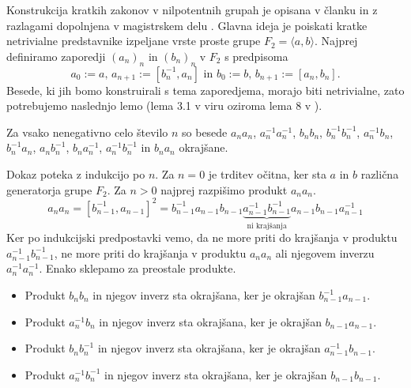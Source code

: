 Konstrukcija kratkih zakonov v nilpotentnih grupah je opisana v članku \cite{Elkasapy_Thom_2013} in z razlagami dopolnjena v magistrskem delu \cite{Schneider_2016}.
Glavna ideja je poiskati kratke netrivialne predstavnike izpeljane vrste proste grupe $F_2 = \langle a, b \rangle $. Najprej definiramo zaporedji $(a_n)_n$ in $(b_n)_n$ v $F_2$ s predpisoma
\begin{equation*}
a_0 := a, \, a_{n + 1} := [b_n^{-1}, a_{n}] \text{ in } b_0 := b, \, b_{n + 1} := [a_{n}, b_{n}]. 
\end{equation*}  
Besede, ki jih bomo konstruirali s tema zaporedjema, morajo biti netrivialne, zato potrebujemo naslednjo lemo (lema 3.1 v viru \cite{Kozma_Thom_2016} oziroma lema 8 v \cite{Schneider_2016}).
\begin{lema}
\label{lem_ni_krajsanj_produkti_ab}
Za vsako nenegativno celo število $n$ so besede $a_{n} a_{n}$, $a_{n}^{-1} a_{n}^{-1}$, $b_{n} b_{n}$, $b_{n}^{-1} b_{n}^{-1}$, $a_{n}^{-1} b_{n}$, $b_{n}^{-1} a_{n}$, $a_{n} b_{n}^{-1}$, $b_{n} a_{n}^{-1}$, $a_{n}^{-1} b_{n}^{-1}$ in $b_{n} a_{n}$ okrajšane.   
\end{lema}
\begin{dokaz}
    Dokaz poteka z indukcijo po $n$. Za $n = 0$ je trditev očitna, ker sta $a$ in $b$ različna generatorja grupe $F_2$. Za $n > 0$ najprej razpišimo produkt $a_n a_n$.
    \begin{equation*}
    a_{n} a_{n} = [b_{n- 1}^{-1}, a_{n-1}]^2 = b_{n- 1}^{-1} a_{n-1} b_{n- 1} \underbrace{a_{n-1}^{-1} b_{n- 1}^{-1}}_{\text{ni krajšanja}}  a_{n-1} b_{n- 1} a_{n-1}^{-1} 
    \end{equation*}  
    Ker po indukcijski predpostavki vemo, da ne more priti do krajšanja v produktu $a_{n -1}^{-1} b_{n -1}^{-1}$, ne more priti do krajšanja v produktu $a_{n} a_{n}$ ali njegovem inverzu $a_{n}^{-1} a_{n}^{-1}$. Enako sklepamo za preostale produkte.
    \begin{itemize}
        \item Produkt $b_{n} b_{n}$ in njegov inverz sta okrajšana, ker je okrajšan $b_{n - 1}^{-1} a_{n-1}.$
        \item Produkt $a_{n}^{-1} b_{n}$ in njegov inverz sta okrajšana, ker je okrajšan $b_{n - 1} a_{n-1}.$
        \item Produkt $b_{n} b_{n}^{-1}$ in njegov inverz sta okrajšana, ker je okrajšan $a_{n - 1}^{-1} b_{n-1}.$
        \item Produkt $a_{n}^{-1} b_{n}^{-1}$ in njegov inverz sta okrajšana, ker je okrajšan $b_{n - 1} b_{n-1}.$
    \end{itemize}     
\end{dokaz}

